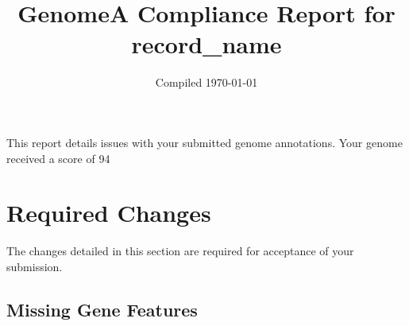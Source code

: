 \documentclass[]{article}
\date{Compiled \today}
\title{GenomeA Compliance Report for {{record_name}}}
\begin{document}
\maketitle
This report details issues with your submitted genome annotations. Your
genome received a score of 94

\section{Required Changes}

The changes detailed in this section are required for acceptance of your
submission.

\subsection{Missing Gene Features}
\end{document}
